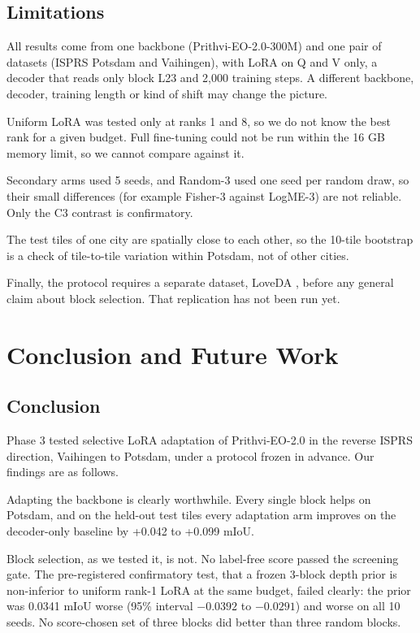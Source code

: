 \documentclass[11pt,a4paper]{report}
\begin{document}
\section{Limitations}

All results come from one backbone (Prithvi-EO-2.0-300M) and one pair of datasets (ISPRS Potsdam and Vaihingen), with LoRA on Q and V only, a decoder that reads only block L23 and 2,000 training steps. A different backbone, decoder, training length or kind of shift may change the picture.

Uniform LoRA was tested only at ranks 1 and 8, so we do not know the best rank for a given budget. Full fine-tuning could not be run within the 16 GB memory limit, so we cannot compare against it.

Secondary arms used 5 seeds, and Random-3 used one seed per random draw, so their small differences (for example Fisher-3 against LogME-3) are not reliable. Only the C3 contrast is confirmatory.

The test tiles of one city are spatially close to each other, so the 10-tile bootstrap is a check of tile-to-tile variation within Potsdam, not of other cities.

Finally, the protocol requires a separate dataset, LoveDA \cite{wang2021loveda}, before any general claim about block selection. That replication has not been run yet.

\chapter{Conclusion and Future Work}
\label{ch:conclusion}

\section{Conclusion}

Phase 3 tested selective LoRA adaptation of Prithvi-EO-2.0 in the reverse ISPRS direction, Vaihingen to Potsdam, under a protocol frozen in advance. Our findings are as follows.

Adapting the backbone is clearly worthwhile. Every single block helps on Potsdam, and on the held-out test tiles every adaptation arm improves on the decoder-only baseline by +0.042 to +0.099 mIoU.

Block selection, as we tested it, is not. No label-free score passed the screening gate. The pre-registered confirmatory test, that a frozen 3-block depth prior is non-inferior to uniform rank-1 LoRA at the same budget, failed clearly: the prior was 0.0341 mIoU worse (95\% interval $-0.0392$ to $-0.0291$) and worse on all 10 seeds. No score-chosen set of three blocks did better than three random blocks.
\end{document}
